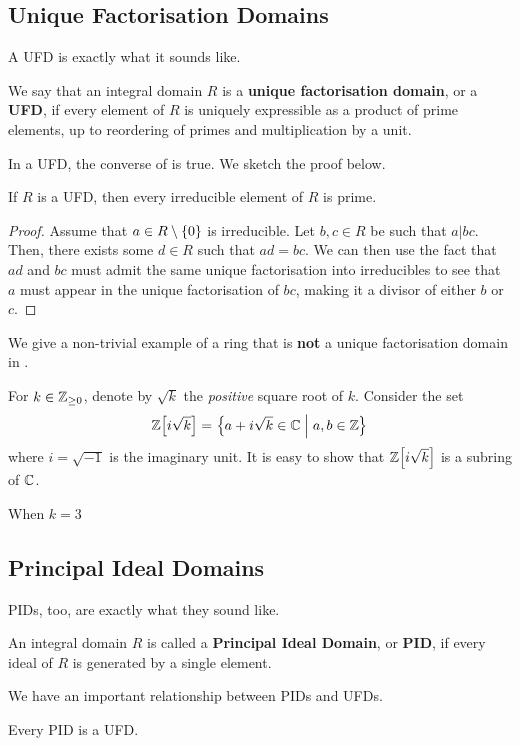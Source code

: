 \subsection{Unique Factorisation Domains}

A UFD is exactly what it sounds like.

\begin{boxdefinition}
    We say that an integral domain $R$ is a \textbf{unique factorisation domain}, or a \textbf{UFD}, if every element of $R$ is uniquely expressible as a product of prime elements, up to reordering of primes and multiplication by a unit.
\end{boxdefinition}

In a UFD, the converse of  is true. We sketch the proof below.

\begin{boxlemma}
    If $R$ is a UFD, then every irreducible element of $R$ is prime.
\end{boxlemma}
\begin{proof}
    Assume that $a \in R \setminus \left\{ 0 \right\}$ is irreducible. Let $b, c \in R$ be such that $a \vert bc$. Then, there exists some $d \in R$ such that $ad = bc$. We can then use the fact that $ad$ and $bc$ must admit the same unique factorisation into irreducibles to see that $a$ must appear in the unique factorisation of $bc$, making it a divisor of either $b$ or $c$.
\end{proof}

We give a non-trivial example of a ring that is \textbf{not} a unique factorisation domain in .

\begin{boxnexample}\label{Ch2:Eg:Z[i sqrt(k)]}
    For $k \in \mathbb{Z}_{\geq 0}$, denote by $\sqrt{k}$ the \textit{positive} square root of $k$. Consider the set
    \begin{align}
        \mathbb{Z}\!\left[ i \sqrt{k} \right] = \left\{ a + i\sqrt{k} \in \mathbb{C} \; \middle\vert \; a, b \in \mathbb{Z} \right\}
    \end{align}
    where $i = \sqrt{-1}$ is the imaginary unit. It is easy to show that $\mathbb{Z}\!\left[ i\sqrt{k} \right]$ is a subring of $\mathbb{C}$.

    When $k = 3$
\end{boxnexample}

\subsection{Principal Ideal Domains}

PIDs, too, are exactly what they sound like.

\begin{boxdefinition}
    An integral domain $R$ is called a \textbf{Principal Ideal Domain}, or \textbf{PID}, if every ideal of $R$ is generated by a single element.
\end{boxdefinition}

We have an important relationship between PIDs and UFDs.

\begin{boxtheorem}
    Every PID is a UFD.
\end{boxtheorem}

